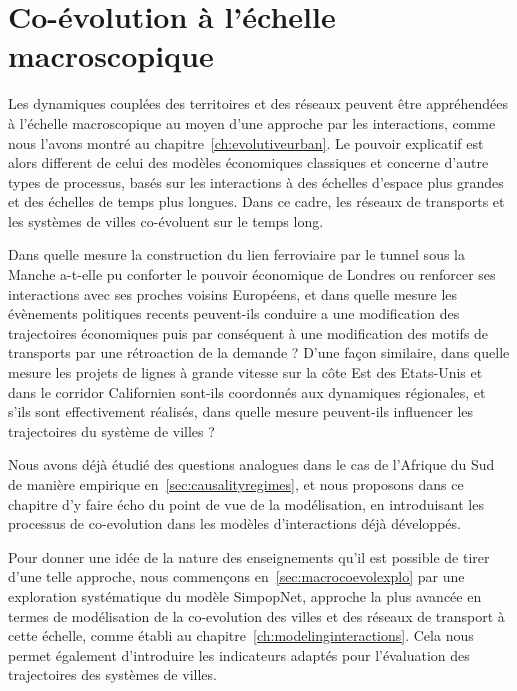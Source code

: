 
\chapter{Co-évolution à l'échelle macroscopique}


\label{ch:macrocoevolution} 



Les dynamiques couplées des territoires et des réseaux peuvent être appréhendées à l'échelle macroscopique au moyen d'une approche par les interactions, comme nous l'avons montré au chapitre~\ref{ch:evolutiveurban}. Le pouvoir explicatif est alors different de celui des modèles économiques classiques et concerne d'autre types de processus, basés sur les interactions à des échelles d'espace plus grandes et des échelles de temps plus longues. Dans ce cadre, les réseaux de transports et les systèmes de villes co-évoluent sur le temps long.


Dans quelle mesure la construction du lien ferroviaire par le tunnel sous la Manche a-t-elle pu conforter le pouvoir économique de Londres ou renforcer ses interactions avec ses proches voisins Européens, et dans quelle mesure les évènements politiques recents peuvent-ils conduire a une modification des trajectoires économiques puis par conséquent à une modification des motifs de transports par une rétroaction de la demande ? D'une façon similaire, dans quelle mesure les projets de lignes à grande vitesse sur la côte Est des Etats-Unis et dans le corridor Californien sont-ils coordonnés aux dynamiques régionales, et s'ils sont effectivement réalisés, dans quelle mesure peuvent-ils influencer les trajectoires du système de villes ?


Nous avons déjà étudié des questions analogues dans le cas de l'Afrique du Sud de manière empirique en~\ref{sec:causalityregimes}, et nous proposons dans ce chapitre d'y faire écho du point de vue de la modélisation, en introduisant les processus de co-evolution dans les modèles d'interactions déjà développés.


Pour donner une idée de la nature des enseignements qu'il est possible de tirer d'une telle approche, nous commençons en~\ref{sec:macrocoevolexplo} par une exploration systématique du modèle SimpopNet, approche la plus avancée en termes de modélisation de la co-evolution des villes et des réseaux de transport à cette échelle, comme établi au chapitre~\ref{ch:modelinginteractions}. Cela nous permet également d'introduire les indicateurs adaptés pour l'évaluation des trajectoires des systèmes de villes.


